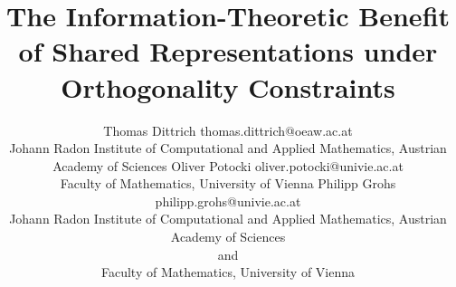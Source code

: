 \documentclass[twoside,11pt]{article}
\begin{document}
\title{
The Information-Theoretic Benefit of Shared Representations under Orthogonality Constraints
}

\author{\name Thomas Dittrich \email thomas.dittrich@oeaw.ac.at \\
       \addr Johann Radon Institute of Computational and Applied Mathematics, Austrian Academy of Sciences
       \AND
       \name Oliver Potocki \email oliver.potocki@univie.ac.at \\
       \addr Faculty of Mathematics, University of Vienna
       \AND
       \name Philipp Grohs \email philipp.grohs@univie.ac.at \\
       \addr Johann Radon Institute of Computational and Applied Mathematics, Austrian Academy of Sciences\\
       \textnormal{and}\\
       Faculty of Mathematics, University of Vienna
       }




\maketitle
\end{document}
